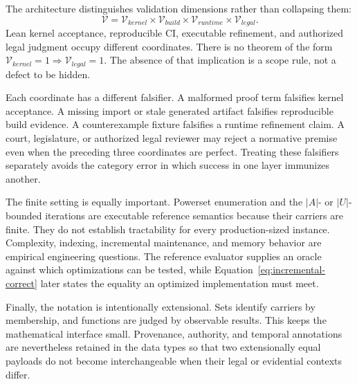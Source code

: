 The architecture distinguishes validation dimensions rather than collapsing them:
\begin{equation}
\mathcal V=
\mathcal V_{kernel}\times\mathcal V_{build}\times
\mathcal V_{runtime}\times\mathcal V_{legal}.
\label{eq:validation-product}
\end{equation}
Lean kernel acceptance, reproducible CI, executable refinement, and authorized legal judgment occupy different coordinates. There is no theorem of the form
$\mathcal V_{kernel}=1\Rightarrow\mathcal V_{legal}=1$. The absence of that implication is a scope rule, not a defect to be hidden.

Each coordinate has a different falsifier. A malformed proof term falsifies kernel acceptance. A missing import or stale generated artifact falsifies reproducible build evidence. A counterexample fixture falsifies a runtime refinement claim. A court, legislature, or authorized legal reviewer may reject a normative premise even when the preceding three coordinates are perfect. Treating these falsifiers separately avoids the category error in which success in one layer immunizes another.

The finite setting is equally important. Powerset enumeration and the $|A|$- or $|U|$-bounded iterations are executable reference semantics because their carriers are finite. They do not establish tractability for every production-sized instance. Complexity, indexing, incremental maintenance, and memory behavior are empirical engineering questions. The reference evaluator supplies an oracle against which optimizations can be tested, while Equation~\eqref{eq:incremental-correct} later states the equality an optimized implementation must meet.

Finally, the notation is intentionally extensional. Sets identify carriers by membership, and functions are judged by observable results. This keeps the mathematical interface small. Provenance, authority, and temporal annotations are nevertheless retained in the data types so that two extensionally equal payloads do not become interchangeable when their legal or evidential contexts differ.
